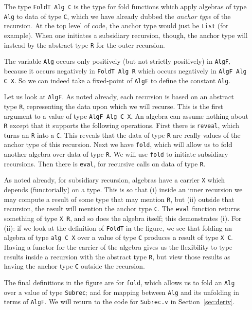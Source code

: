 \documentclass[a4paper,USenglish]{lipics-v2021}
\begin{document}
The type \verb|FoldT Alg C| is the type for fold functions which apply
algebras of type \verb|Alg| to data of type \verb|C|, which we have
already dubbed the \emph{anchor type} of the recursion.  At the top
level of code, the anchor type would just be \verb|List| (for
example).  When one initiates a subsidiary recursion, though, the
anchor type will instead by the abstract type \verb|R| for the outer recursion.

The variable \verb|Alg| occurs only positively (but not strictly
positively) in \verb|AlgF|, because it occurs negatively in
\verb|FoldT Alg R| which occurs negatively in \verb|AlgF Alg C X|.  So
we can indeed take a fixed-point of \verb|AlgF| to define the constant
\verb|Alg|.

Let us look at \verb|AlgF|.  As noted already, each recursion is based
on an abstract type \verb|R|, representing the data upon which we will
recurse.  This is the first argument to a value of type
\verb|AlgF Alg C X|.  An algebra can assume nothing about \verb|R|
except that it supports the following operations.  First there is
\verb|reveal|, which turns an \verb|R| into a \verb|C|.  This reveals
that the data of type \verb|R| are really values of the anchor type
of this recursion.  Next we have \texttt{fold}, which will allow us to fold
another algebra over data of type \verb|R|.  We will use \verb|fold|
to initiate subsidiary recursions.  Then there is \verb|eval|, for
recursive calls on data of type \verb|R|.

As noted already, for subsidiary recursion, algebras have a carrier
\verb|X| which depends (functorially) on a type.  This is so that (i)
inside an inner recursion we may compute a result of some type that
may mention \verb|R|, but (ii) outside that recursion, the result will
mention the anchor type \verb|C|.  The \verb|eval| function returns
something of type \verb|X R|, and so does the algebra itself; this
demonstrates (i).  For (ii): if we look at the definition of
\verb|FoldT| in the figure, we see that folding an algebra of type
\verb|alg C X| over a value of type \verb|C| produces a result of type
\verb|X C|.  Having a functor for the carrier of the algebra gives us
the flexibility to type results inside a recursion with the abstract
type \verb|R|, but view those results as having the anchor type
\verb|C| outside the recursion.

The final definitions in the figure are for \verb|fold|, which allows
us to fold an \verb|Alg| over a value of type \verb|Subrec|; and for mapping
between \verb|Alg| and its unfolding in terms of \verb|AlgF|.  We will
return to the code for \verb|Subrec.v| in Section~\ref{sec:deriv}.
\end{document}
